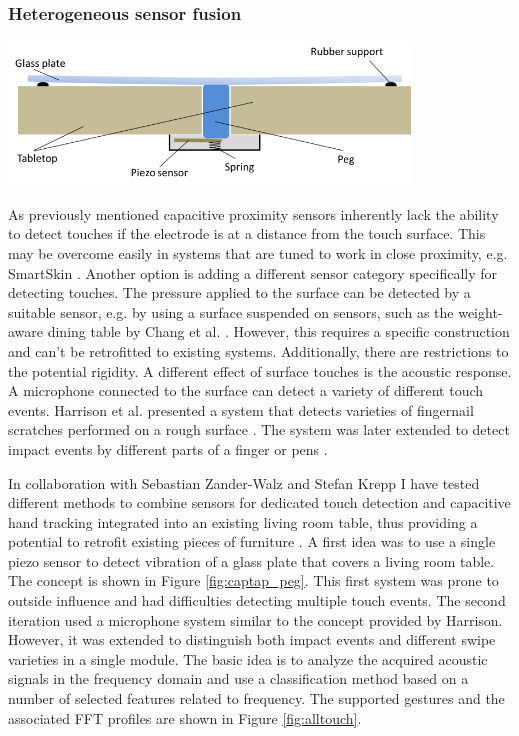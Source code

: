 \subsubsection{Heterogeneous sensor fusion}
\begin{minipage}{\linewidth}
\centering
\includegraphics[width=0.8\textwidth]{images/captap_peg}
\label{fig:captap_peg}
\end{minipage}

As previously mentioned capacitive proximity sensors inherently lack the ability to detect touches if the electrode is at a distance from the touch surface. This may be overcome easily in systems that are tuned to work in close proximity, e.g. SmartSkin \cite{rekimoto2002smartskin}. Another option is adding a different sensor category specifically for detecting touches. The pressure applied to the surface can be detected by a suitable sensor, e.g. by using a surface suspended on sensors, such as the weight-aware dining table by Chang et al. \cite{chang2006diet}. However, this requires a specific construction and can't be retrofitted to existing systems. Additionally, there are restrictions to the potential rigidity. A different effect of surface touches is the acoustic response. A microphone connected to the surface can detect a variety of different touch events. Harrison et al. presented a system that detects varieties of fingernail scratches performed on a rough surface \cite{harrison2008scratch}. The system was later extended to detect impact events by different parts of a finger or pens \cite{harrison2011tapsense}. 

In collaboration with Sebastian Zander-Walz and Stefan Krepp I have tested different methods to combine sensors for dedicated touch detection and capacitive hand tracking integrated into an existing living room table, thus providing a potential to retrofit existing pieces of furniture \cite{Braun2013captap}. A first idea was to use a single piezo sensor to detect vibration of a glass plate that covers a living room table. The concept is shown in Figure \ref{fig:captap_peg}. This first system was prone to outside influence and had difficulties detecting multiple touch events. The second iteration used a microphone system similar to the concept provided by Harrison. However, it was extended to distinguish both impact events and different swipe varieties in a single module. The basic idea is to analyze the acquired acoustic signals in the frequency domain and use a classification method based on a number of selected features related to frequency. The supported gestures and the associated FFT profiles are shown in Figure \ref{fig:alltouch}.


